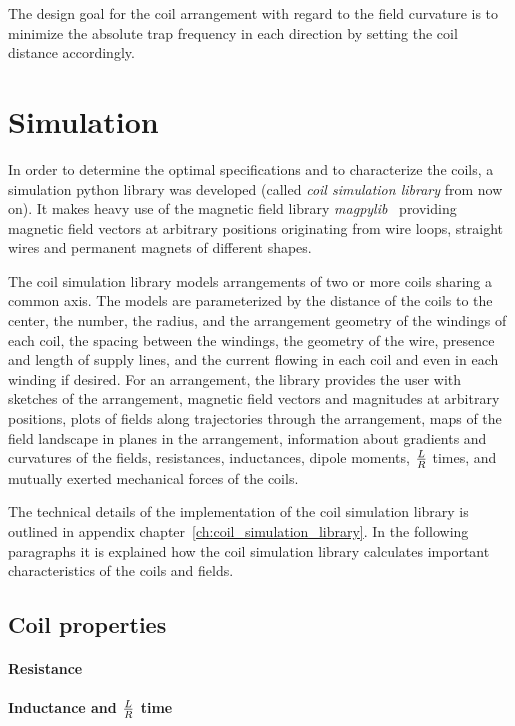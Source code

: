 The design goal for the coil arrangement with regard to the field curvature is to minimize the absolute trap frequency in each direction by setting the coil distance accordingly.

\section{Simulation}\label{ch:simulation}
In order to determine the optimal specifications and to characterize the coils, a simulation python library was developed (called \textit{coil simulation library} from now on). It makes heavy use of the magnetic field library \textit{magpylib}~\cite{ortner_magpylib_2020, noauthor_magpylibmagpylib_2022} providing magnetic field vectors at arbitrary positions originating from wire loops, straight wires and permanent magnets of different shapes.

The coil simulation library models arrangements of two or more coils sharing a common axis. The models are parameterized by the distance of the coils to the center, the number, the radius, and the arrangement geometry of the windings of each coil, the spacing between the windings, the geometry of the wire, presence and length of supply lines, and the current flowing in each coil and even in each winding if desired. For an arrangement, the library provides the user with sketches of the arrangement, magnetic field vectors and magnitudes at arbitrary positions, plots of fields along trajectories through the arrangement, maps of the field landscape in planes in the arrangement, information about gradients and curvatures of the fields, resistances, inductances, dipole moments, $L\over R$ times, and mutually exerted mechanical forces of the coils.

The technical details of the implementation of the coil simulation library is outlined in appendix chapter~\ref{ch:coil_simulation_library}. In the following paragraphs it is explained how the coil simulation library calculates important characteristics of the coils and fields.

\subsection*{Coil properties}

\paragraph{Resistance}
\paragraph{Inductance and $L\over R$ time}
